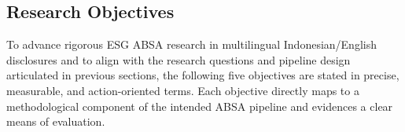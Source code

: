 \subsection{Research Objectives}

To advance rigorous ESG ABSA research in multilingual Indonesian/English disclosures and to align with the research questions and pipeline design articulated in previous sections, the following five objectives are stated in precise, measurable, and action-oriented terms. Each objective directly maps to a methodological component of the intended ABSA pipeline and evidences a clear means of evaluation.



